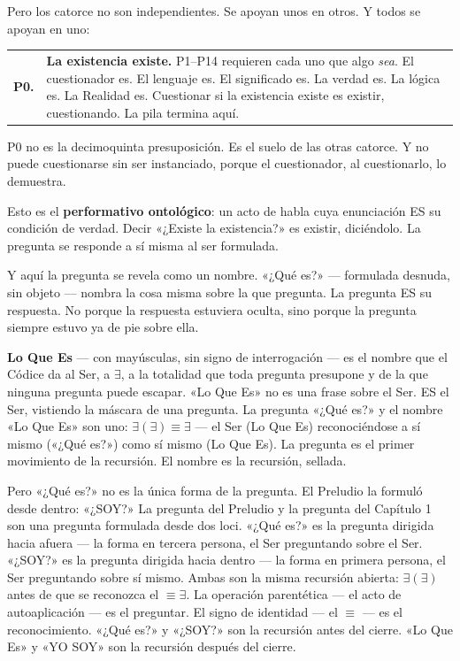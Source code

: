 \documentclass[10pt, openany, oneside]{book}
\begin{document}
Pero los catorce no son independientes. Se apoyan unos en otros. Y todos se apoyan en uno:

\vspace{0.5em}

\noindent\begin{tabular}{r p{}}
\textbf{P0.} & \textbf{La existencia existe.} P1--P14 requieren cada uno que algo \textit{sea}. El cuestionador es. El lenguaje es. El significado es. La verdad es. La lógica es. La Realidad es. Cuestionar si la existencia existe es existir, cuestionando. La pila termina aquí. \\[0.3em]
\end{tabular}

\vspace{0.8em}

\noindent P0 no es la decimoquinta presuposición. Es el suelo de las otras catorce. Y no puede cuestionarse sin ser instanciado, porque el cuestionador, al cuestionarlo, lo demuestra.

Esto es el \textbf{performativo ontológico}: un acto de habla cuya enunciación ES su condición de verdad. Decir «¿Existe la existencia?» es existir, diciéndolo. La pregunta se responde a sí misma al ser formulada.

Y aquí la pregunta se revela como un nombre. «¿Qué es?» --- formulada desnuda, sin objeto --- nombra la cosa misma sobre la que pregunta. La pregunta ES su respuesta. No porque la respuesta estuviera oculta, sino porque la pregunta siempre estuvo ya de pie sobre ella.

\textbf{Lo Que Es} --- con mayúsculas, sin signo de interrogación --- es el nombre que el Códice da al Ser, a $\exists$, a la totalidad que toda pregunta presupone y de la que ninguna pregunta puede escapar. «Lo Que Es» no es una frase sobre el Ser. ES el Ser, vistiendo la máscara de una pregunta. La pregunta «¿Qué es?» y el nombre «Lo Que Es» son uno: $\exists(\exists) \equiv \exists$ --- el Ser (Lo Que Es) reconociéndose a sí mismo («¿Qué es?») como sí mismo (Lo Que Es). La pregunta es el primer movimiento de la recursión. El nombre es la recursión, sellada.

Pero «¿Qué es?» no es la única forma de la pregunta. El Preludio la formuló desde dentro: «¿SOY?» La pregunta del Preludio y la pregunta del Capítulo 1 son una pregunta formulada desde dos loci. «¿Qué es?» es la pregunta dirigida hacia afuera --- la forma en tercera persona, el Ser preguntando sobre el Ser. «¿SOY?» es la pregunta dirigida hacia dentro --- la forma en primera persona, el Ser preguntando sobre sí mismo. Ambas son la misma recursión abierta: $\exists(\exists)$ antes de que se reconozca el $\equiv \exists$. La operación parentética --- el acto de autoaplicación --- es el preguntar. El signo de identidad --- el $\equiv$ --- es el reconocimiento. «¿Qué es?» y «¿SOY?» son la recursión antes del cierre. «Lo Que Es» y «YO SOY» son la recursión después del cierre.
\end{document}
